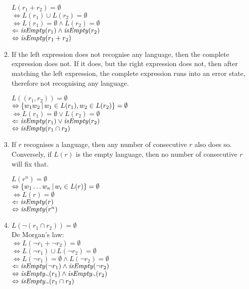 \begin{lem}
\begin{enumerate}[label=\textbf{(\arabic*)}]
         $L(r_1 + r_2) = \emptyset$ \\
         $\Leftrightarrow L(r_1) \cup L(r_2) = \emptyset$ \\
         $\Leftrightarrow L(r_1) = \emptyset \wedge L(r_2) = \emptyset$ \\
         $\Leftarrow \mathit{isEmpty}(r_1) \wedge \mathit{isEmpty}(r_2)$ \\
         $\Leftrightarrow \mathit{isEmpty}(r_1 + r_2)$

      \item
         If the left expression does not recognise any language, then the
         complete expression does not. If it does, but the right expression does
         not, then after matching the left expression, the complete expression
         runs into an error state, therefore not recognising any language.

         $L((r_1, r_2)) = \emptyset$ \\
         $\Leftrightarrow \{ w_1w_2 \operatorname{|} w_1 \in L(r_1), w_2 \in L(r_2) \} = \emptyset$ \\
         $\Leftrightarrow L(r_1) = \emptyset \vee L(r_2) = \emptyset$ \\
         $\Leftarrow \mathit{isEmpty}(r_1) \vee \mathit{isEmpty}(r_2)$ \\
         $\Leftrightarrow \mathit{isEmpty}(r_1 \cap r_2)$

      \item
         If $r$ recognises a language, then any number of consecutive $r$ also
         does so. Conversely, if $L(r)$ is the empty language, then no number of
         consecutive $r$ will fix that.

         \needspace{3cm}
         $L(r^n) = \emptyset$ \\
         $\Leftrightarrow \{ w_1 \dots w_n \operatorname{|} w_i \in L(r) \} = \emptyset$ \\
         $\Leftrightarrow L(r) = \emptyset$ \\
         $\Leftarrow \mathit{isEmpty}(r)$ \\
         $\Leftrightarrow \mathit{isEmpty}(r^n)$

      \item
         $L(\neg(r_1 \cap r_2)) = \emptyset$ \\
         De Morgan's law: \\
         $\Leftrightarrow L(\neg r_1 + \neg r_2) = \emptyset$ \\
         $\Leftrightarrow L(\neg r_1) \cup L(\neg r_2) = \emptyset$ \\
         $\Leftrightarrow L(\neg r_1) = \emptyset \wedge L(\neg r_2) = \emptyset$ \\
         $\Leftarrow \mathit{isEmpty}(\neg r_1) \wedge \mathit{isEmpty}(\neg r_2)$ \\
         $\Leftrightarrow \mathit{isEmpty_\neg}(r_1) \wedge \mathit{isEmpty_\neg}(r_2)$ \\
         $\Leftrightarrow \mathit{isEmpty_\neg}(r_1 \cap r_2)$


\end{enumerate}
\end{lem}
